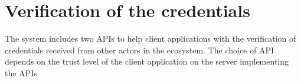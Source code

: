 \documentclass[letterpaper,10pt,english]{sphinxmanual}
\begin{document}
\begin{sphinxVerbatim}[commandchars=\\\{\}]
                             
                             
                         
                 \PYG{p}{[}
                \PYG{p}{],}
                 
\end{sphinxVerbatim}


\section{Verification of the credentials}
\label{\detokenize{privacycred:verification-of-the-credentials}}
\sphinxAtStartPar
The system includes two APIs to help client applications with the verification of credentials received from other actors in the ecosystem. The choice of API depends on the trust level of the client application on the server implementing the APIs
\end{document}
